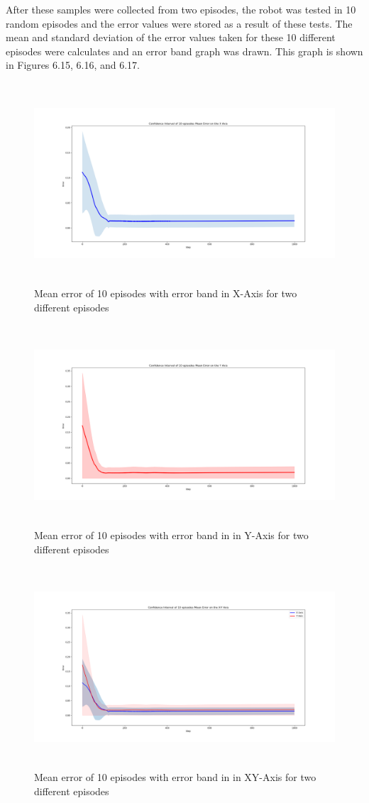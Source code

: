 \documentclass[12pt,twoside,a4]{mwbk}
\begin{document}
\noindent After these samples were collected from two episodes, the robot was tested in 10 random episodes and the error values were stored as a result of these tests. The mean and standard deviation of the error values taken for these 10 different episodes were calculates and an error band graph was drawn. This graph is shown in Figures 6.15, 6.16, and 6.17.
\begin{figure}[h!]
    \centering
    \includegraphics[width=15cm, height=7.5cm]{mean_err_x.png}
    \caption{Mean error of 10 episodes with error band in X-Axis for two different episodes}
\end{figure}
\newpage
\begin{figure}[h!]
    \centering
    \includegraphics[width=15cm, height=7.5cm]{mean_err_y.png}
    \caption{Mean error of 10 episodes with error band in in Y-Axis for two different episodes}
\end{figure}
\begin{figure}[h!]
    \centering
    \includegraphics[width=15cm, height=7.5cm]{mean_err_x_y.png}
    \caption{Mean error of 10 episodes with error band in in XY-Axis for two different episodes}
\end{figure}
\end{document}
